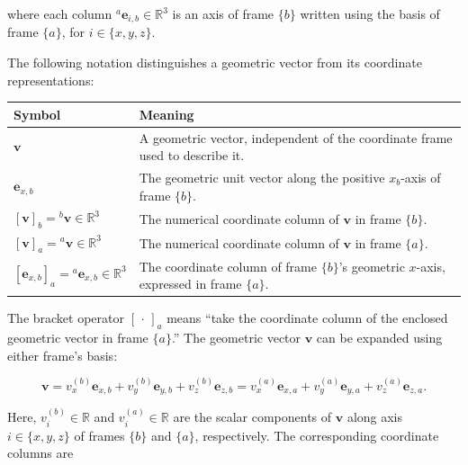 \documentclass[
  australian,
  12pt,
  letterpaper,
  DIV=11,
  numbers=noendperiod,
  twoside]{scrreprt}
\newcounter{none} %
\begin{document}
where each column \({}^{a}\mathbf e_{i,b}\in\mathbb R^3\) is an axis of
frame \(\{b\}\) written using the basis of frame \(\{a\}\), for
\(i\in\{x,y,z\}\).

The following notation distinguishes a geometric vector from its
coordinate representations:

{\def\LTcaptype{none} %
\begin{longtable}[]{@{}
  >{\raggedright\arraybackslash}p{}
  >{\raggedright\arraybackslash}p{}@{}}
\toprule\noalign{}
\begin{minipage}[b]{\linewidth}\raggedright
Symbol
\end{minipage} & \begin{minipage}[b]{\linewidth}\raggedright
Meaning
\end{minipage} \\
\midrule\noalign{}
\endhead
\bottomrule\noalign{}
\endlastfoot
\(\mathbf v\) & A geometric vector, independent of the coordinate frame
used to describe it. \\
\(\mathbf e_{x,b}\) & The geometric unit vector along the positive
\(x_b\)-axis of frame \(\{b\}\). \\
\([\mathbf v]_b={}^{b}\mathbf v\in\mathbb R^3\) & The numerical
coordinate column of \(\mathbf v\) in frame \(\{b\}\). \\
\([\mathbf v]_a={}^{a}\mathbf v\in\mathbb R^3\) & The numerical
coordinate column of \(\mathbf v\) in frame \(\{a\}\). \\
\([\mathbf e_{x,b}]_a={}^{a}\mathbf e_{x,b}\in\mathbb R^3\) & The
coordinate column of frame \(\{b\}\)'s geometric \(x\)-axis, expressed
in frame \(\{a\}\). \\
\end{longtable}
}

The bracket operator \([\,\cdot\,]_a\) means ``take the coordinate
column of the enclosed geometric vector in frame \(\{a\}\).'' The
geometric vector \(\mathbf v\) can be expanded using either frame's
basis:

\[
\boxed{
\mathbf v
=
v_x^{(b)}\mathbf e_{x,b}
+
v_y^{(b)}\mathbf e_{y,b}
+
v_z^{(b)}\mathbf e_{z,b}
=
v_x^{(a)}\mathbf e_{x,a}
+
v_y^{(a)}\mathbf e_{y,a}
+
v_z^{(a)}\mathbf e_{z,a}
}.
\]

Here, \(v_i^{(b)}\in\mathbb R\) and \(v_i^{(a)}\in\mathbb R\) are the
scalar components of \(\mathbf v\) along axis \(i\in\{x,y,z\}\) of
frames \(\{b\}\) and \(\{a\}\), respectively. The corresponding
coordinate columns are
\end{document}
